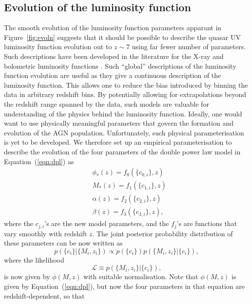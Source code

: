 \documentclass[a4paper,fleqn,usenatbib]{mnras}
\begin{document}
\subsection{Evolution of the luminosity function}

The smooth evolution of the luminosity function parameters apparant in
Figure~\ref{fig:evoln} suggests that it should be possible to describe
the quasar UV luminosity function evolution out to $z\sim 7$ using far
fewer number of parameters.  Such descriptions have been developed in
the literature for the X-ray \citep[e.g.,][]{2015MNRAS.451.1892A} and
bolometric luminosity functions \citep[e.g.,][]{2007ApJ...654..731H}.
Such ``global'' descriptions of the luminosity function evolution are
useful as they give a continuous description of the luminosity
function.  This allows one to reduce the bias introduced by binning
the data in arbitrary redshift bins.  By potentially allowing for
extrapolations beyond the redshift range spanned by the data, such
models are valuable for understanding of the physics behind the
luminosity function.  Ideally, one would want to use physically
meaningful parameters that govern the formation and evolution of the
AGN population.  Unfortunately, such physical parameterisation is yet
to be developed.  We therefore set up an empirical parameterisation to
describe the evolution of the four parameters of the double power law
model in Equation~(\ref{eqn:dpl}) as 
\begin{align}
  &\phi_*(z) = f_0(\{c_{0,i}\}, z)\nonumber\\
  &M_*(z) = f_1(\{c_{1,i}\}, z)\nonumber\\
  &\alpha(z) = f_2(\{c_{2,i}\}, z)\nonumber\\
  &\beta(z) = f_3(\{c_{3,i}\}, z),
\label{eqn:global}
\end{align}
where the $c_{j,i}$'s are the new model parameters, and the $f_j$'s
are functions that vary smoothly with redshift $z$.  The joint
posterior probability distribution of these parameters can be now
written as
\begin{equation}
  p(\{c_i\} | \{M_i, z_i\}) \propto p(\{c_i\})p(\{M_i, z_i\} | \{c_i\}),
\end{equation}
where the likelihood 
\begin{equation}
  \mathcal{L}\equiv p(\{M_i, z_i\} | \{c_i\}),
\end{equation}
is now given by $\phi(M,z)$ with suitable normalisation.  Note that
$\phi(M,z)$ is given by Equation~(\ref{eqn:dpl}), but now the four
parameters in that equation are redshift-dependent, so that
\end{document}
